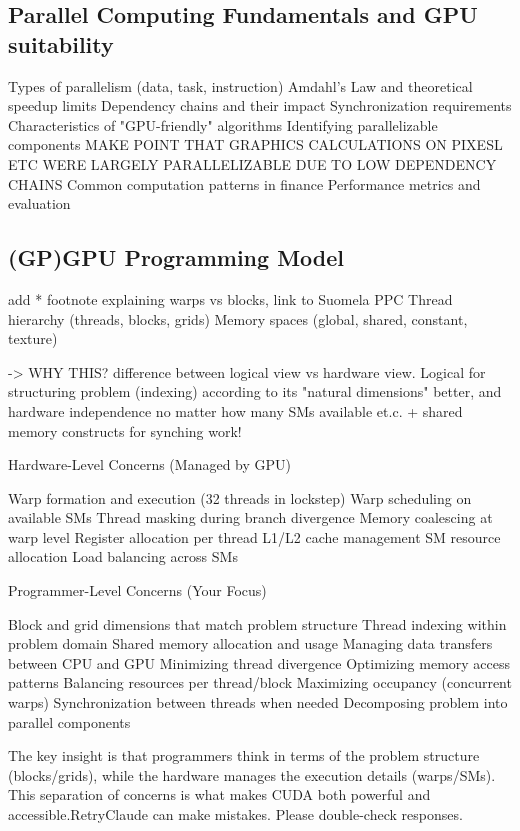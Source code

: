 \documentclass[english,12pt,a4paper,pdftex,sci,utf8]{aaltothesis}
\begin{document}
\subsection{Parallel Computing Fundamentals and GPU suitability}\label{subsec:parallell}

Types of parallelism (data, task, instruction)
Amdahl's Law and theoretical speedup limits
Dependency chains and their impact
Synchronization requirements
Characteristics of "GPU-friendly" algorithms
Identifying parallelizable components
MAKE POINT THAT GRAPHICS CALCULATIONS ON PIXESL ETC WERE LARGELY PARALLELIZABLE DUE TO LOW DEPENDENCY CHAINS  
Common computation patterns in finance
Performance metrics and evaluation






\subsection{(GP)GPU Programming Model}



add * footnote explaining warps vs blocks, link to Suomela PPC
Thread hierarchy (threads, blocks, grids)
Memory spaces (global, shared, constant, texture)

-> WHY THIS? difference between logical view vs hardware view. Logical for structuring problem (indexing) according to its "natural dimensions" better, and hardware independence no matter how many SMs available et.c. + shared memory constructs for synching work!




Hardware-Level Concerns (Managed by GPU)

Warp formation and execution (32 threads in lockstep)
Warp scheduling on available SMs
Thread masking during branch divergence
Memory coalescing at warp level
Register allocation per thread
L1/L2 cache management
SM resource allocation
Load balancing across SMs

Programmer-Level Concerns (Your Focus)

Block and grid dimensions that match problem structure
Thread indexing within problem domain
Shared memory allocation and usage
Managing data transfers between CPU and GPU
Minimizing thread divergence
Optimizing memory access patterns
Balancing resources per thread/block
Maximizing occupancy (concurrent warps)
Synchronization between threads when needed
Decomposing problem into parallel components

The key insight is that programmers think in terms of the problem structure (blocks/grids), while the hardware manages the execution details (warps/SMs). This separation of concerns is what makes CUDA both powerful and accessible.RetryClaude can make mistakes. Please double-check responses.
\end{document}
